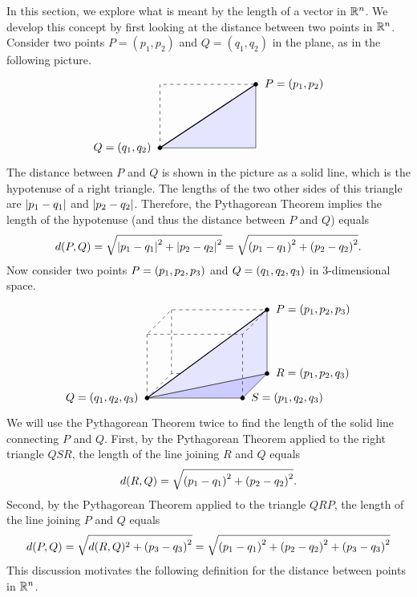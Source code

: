 In this section, we explore what is meant by the length of a vector in
$\mathbb{R}^n$.  We develop this concept by first looking at the distance
between two points in $\mathbb{R}^n$. Consider two points $P=(p_1,p_2)$ and
$Q=(q_1,q_2)$ in the plane, as in the following picture.
\[
  \begin{tikzpicture}[scale=1]
    \draw[dashed] (0,0) -- (0,2) -- (3,2);
    \draw[fill=blue!10] (0,0) -- (3,0) -- (3,2) -- cycle;
    \draw[thick] (0,0) -- (3,2);
    \draw[fill](0,0) circle [radius=1.8pt] node[left=1ex]{$Q=(q_1,q_2)$};
    \draw[fill](3,2) circle [radius=1.8pt] node[right=1ex]{$P=(p_1,p_2)$};
  \end{tikzpicture}
\]
The distance between $P$ and $Q$ is shown in the picture as a solid
line, which is the hypotenuse of a right triangle.  The lengths of the
two other sides of this triangle are $\left|p_{1}-q_{1}\right| $ and
$\left|p_{2}-q_{2}\right|$. Therefore, the Pythagorean Theorem implies the
length of the hypotenuse (and thus the distance between $P$ and $Q$)
equals
\begin{equation*}
  d(P,Q)
  =\sqrt{\left|p_{1}-q_{1}\right|^{2}+\left|p_{2}-q_{2}\right|^{2}}
  =\sqrt{\left(p_{1}-q_{1}\right)^{2}+\left(p_{2}-q_{2}\right)^{2}}.
\end{equation*}
Now consider two points $P=\left(p_{1},p_{2},p_{3}\right)$ and
$Q = \left(q_{1},q_{2},q_{3}\right)$ in 3-dimensional space.
\[
  \begin{tikzpicture}[scale=1]
    \draw[dashed] (3,0,-2) -- (0,0,-2) -- (0,0,0);
    \draw[dashed] (0,0,0) -- (0,2,0);
    \draw[dashed] (0,0,-2) -- (0,2,-2);
    \draw[fill=blue!20] (0,0,0) -- (3,0,0) -- (3,0,-2) -- cycle;
    \draw[fill=blue!10] (0,0,0) -- (3,0,-2) -- (3,2,-2) -- cycle;
    \draw[dashed] (0,2,0) -- (3,2,0) -- (3,2,-2) -- (0,2,-2) -- cycle;
    \draw[dashed] (3,0,0) -- (3,2,0);
    \draw[thick] (0,0,0) -- (3,2,-2);
    \draw[fill](0,0,0) circle [radius=1.8pt] node[left=1ex]{$Q=(q_1,q_2,q_3)$};
    \draw[fill](3,2,-2) circle [radius=1.8pt] node[right=1ex]{$P=(p_1,p_2,p_3)$};
    \draw[fill](3,0,-2) circle [radius=1.8pt] node[right=1ex]{$R=(p_1,p_2,q_3)$};
    \draw[fill](3,0,0) circle [radius=1.8pt] node[right=1ex]{$S=(p_1,q_2,q_3)$};
  \end{tikzpicture}
\]
We will use the Pythagorean Theorem twice to find the length of the
solid line connecting $P$ and $Q$. First, by the Pythagorean Theorem
applied to the right triangle $QSR$, the length of the line joining
$R$ and $Q$ equals
\begin{equation*}
d(R,Q) = \sqrt{ \left(p_{1}-q_{1}\right) ^{2}+\left(p_{2}-q_{2}\right) ^{2}}.
\end{equation*}
Second, by the Pythagorean Theorem applied to the triangle $QRP$, the
length of the line joining $P$ and $Q$ equals
\begin{equation*}
d(P,Q)=\sqrt{d(R,Q)^{2}+\left(p_{3}-q_{3}\right)^{2}}
 =\sqrt{ \left(p_{1}-q_{1}\right)^{2}+\left(p_{2}-q_{2}\right)^{2}+\left(p_{3}-q_{3}\right)^{2}}
\end{equation*}
This discussion motivates the following definition for the distance
between points in $\mathbb{R}^n$.

